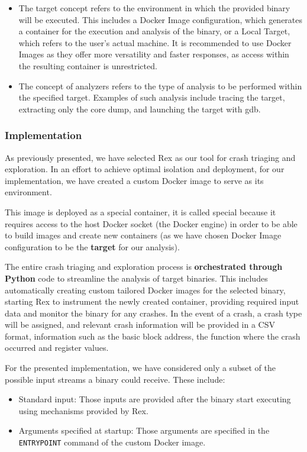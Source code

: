 \documentclass[12pt,a4paper,english,onecolumn]{IEEEtran}
\begin{document}
\begin{itemize}
    \item The target concept refers to the environment in which the provided binary will be executed. This includes a Docker Image configuration, which generates a container for the execution and analysis of the binary, or a Local Target, which refers to the user's actual machine. It is recommended to use Docker Images as they offer more versatility and faster responses, as access within the resulting container is unrestricted.
    \item The concept of analyzers refers to the type of analysis to be performed within the specified target. Examples of such analysis include tracing the target, extracting only the core dump, and launching the target with gdb.
\end{itemize}

\subsubsection{Implementation}

As previously presented, we have selected Rex as our tool for crash triaging and exploration. In an effort to achieve optimal isolation and deployment, for our implementation, we have created a custom Docker image to serve as its environment.

This image is deployed as a special container, it is called special because it requires access to the host Docker socket (the Docker engine) in order to be able to build images and create new containers (as we have chosen Docker Image configuration to be the \textbf{target} for our analysis).

The entire crash triaging and exploration process is \textbf{orchestrated through Python} code to streamline the analysis of target binaries. This includes automatically creating custom tailored Docker images for the selected binary, starting Rex to instrument the newly created container, providing required input data and monitor the binary for any crashes. In the event of a crash, a crash type will be assigned, and relevant crash information will be provided in a CSV format, information such as the basic block address, the function where the crash occurred and register values.

For the presented implementation, we have considered only a subset of the possible input streams a binary could receive. These include:

\begin{itemize}
    \item Standard input: Those inputs are provided after the binary start executing using mechanisms provided by Rex.
    \item Arguments specified at startup: Those arguments are specified in the \texttt{ENTRYPOINT} command of the custom Docker image.
\end{itemize}
\end{document}
